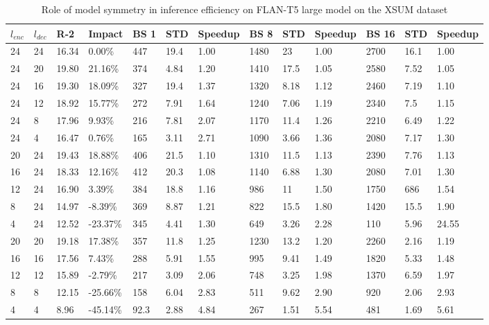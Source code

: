 \begin{table*}[!ht]
    \centering
    \caption{Role of model symmetry in inference efficiency on FLAN-T5 large model on the XSUM dataset}
    \small
    \begin{tabular}{|l|l|l|l|l|l|l|l|l|l|l|l|l|}
    \hline
         $l_{enc}$ & $l_{dec}$ & R-2 & Impact & BS 1 & STD & Speedup & BS 8 & STD  & Speedup & BS 16 & STD & Speedup\\ \hline
         24 & 24 & 16.34 & 0.00\% & 447 & 19.4 & 1.00 & 1480 & 23 & 1.00 & 2700 & 16.1 & 1.00 \\ \hline
        24 & 20 & 19.80 & 21.16\% & 374 & 4.84 & 1.20 & 1410 & 17.5 & 1.05 & 2580 & 7.52 & 1.05 \\ \hline
        24 & 16 & 19.30 & 18.09\% & 327 & 19.4 & 1.37 & 1320 & 8.18 & 1.12 & 2460 & 7.19 & 1.10 \\ \hline
        24 & 12 & 18.92 & 15.77\% & 272 & 7.91 & 1.64 & 1240 & 7.06 & 1.19 & 2340 & 7.5 & 1.15 \\ \hline
        24 & 8 & 17.96 & 9.93\% & 216 & 7.81 & 2.07 & 1170 & 11.4 & 1.26 & 2210 & 6.49 & 1.22 \\ \hline
        24 & 4 & 16.47 & 0.76\% & 165 & 3.11 & 2.71 & 1090 & 3.66 & 1.36 & 2080 & 7.17 & 1.30 \\ \hline
        20 & 24 & 19.43 & 18.88\% & 406 & 21.5 & 1.10 & 1310 & 11.5 & 1.13 & 2390 & 7.76 & 1.13 \\ \hline
        16 & 24 & 18.33 & 12.16\% & 412 & 20.3 & 1.08 & 1140 & 6.88 & 1.30 & 2080 & 7.01 & 1.30 \\ \hline
        12 & 24 & 16.90 & 3.39\% & 384 & 18.8 & 1.16 & 986 & 11 & 1.50 & 1750 & 686 & 1.54 \\ \hline
        8 & 24 & 14.97 & -8.39\% & 369 & 8.87 & 1.21 & 822 & 15.5 & 1.80 & 1420 & 15.5 & 1.90 \\ \hline
        4 & 24 & 12.52 & -23.37\% & 345 & 4.41 & 1.30 & 649 & 3.26 & 2.28 & 110 & 5.96 & 24.55 \\ \hline
        20 & 20 & 19.18 & 17.38\% & 357 & 11.8 & 1.25 & 1230 & 13.2 & 1.20 & 2260 & 2.16 & 1.19 \\ \hline
        16 & 16 & 17.56 & 7.43\% & 288 & 5.91 & 1.55 & 995 & 9.41 & 1.49 & 1820 & 5.33 & 1.48 \\ \hline
        12 & 12 & 15.89 & -2.79\% & 217 & 3.09 & 2.06 & 748 & 3.25 & 1.98 & 1370 & 6.59 & 1.97 \\ \hline
        8 & 8 & 12.15 & -25.66\% & 158 & 6.04 & 2.83 & 511 & 9.62 & 2.90 & 920 & 2.06 & 2.93 \\ \hline
        4 & 4 & 8.96 & -45.14\% & 92.3 & 2.88 & 4.84 & 267 & 1.51 & 5.54 & 481 & 1.69 & 5.61 \\ \hline
    \end{tabular}
    \label{tab:xsum-asym-inference-large}
\end{table*}
